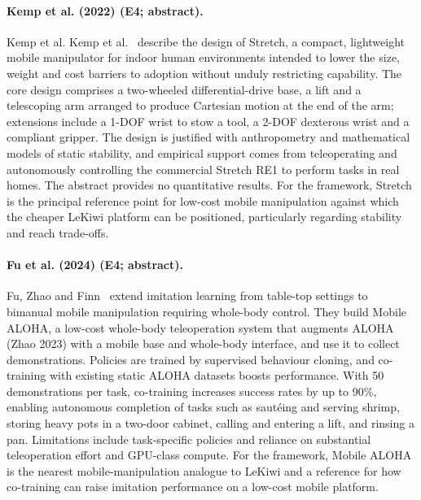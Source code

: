 \documentclass[10pt,a4paper]{article}
\begin{document}
\paragraph{Kemp et al. (2022) (E4; abstract).} Kemp et al. Kemp et al.~\cite{Kemp2022} describe the design of Stretch, a compact, lightweight mobile manipulator for indoor human environments intended to lower the size, weight and cost barriers to adoption without unduly restricting capability. The core design comprises a two-wheeled differential-drive base, a lift and a telescoping arm arranged to produce Cartesian motion at the end of the arm; extensions include a 1-DOF wrist to stow a tool, a 2-DOF dexterous wrist and a compliant gripper. The design is justified with anthropometry and mathematical models of static stability, and empirical support comes from teleoperating and autonomously controlling the commercial Stretch RE1 to perform tasks in real homes. The abstract provides no quantitative results. For the framework, Stretch is the principal reference point for low-cost mobile manipulation against which the cheaper LeKiwi platform can be positioned, particularly regarding stability and reach trade-offs.

\paragraph{Fu et al. (2024) (E4; abstract).} Fu, Zhao and Finn~\cite{Fu2024} extend imitation learning from table-top settings to bimanual mobile manipulation requiring whole-body control. They build Mobile ALOHA, a low-cost whole-body teleoperation system that augments ALOHA (Zhao 2023) with a mobile base and whole-body interface, and use it to collect demonstrations. Policies are trained by supervised behaviour cloning, and co-training with existing static ALOHA datasets boosts performance. With 50 demonstrations per task, co-training increases success rates by up to 90\%, enabling autonomous completion of tasks such as saut\'eing and serving shrimp, storing heavy pots in a two-door cabinet, calling and entering a lift, and rinsing a pan. Limitations include task-specific policies and reliance on substantial teleoperation effort and GPU-class compute. For the framework, Mobile ALOHA is the nearest mobile-manipulation analogue to LeKiwi and a reference for how co-training can raise imitation performance on a low-cost mobile platform.
\end{document}
